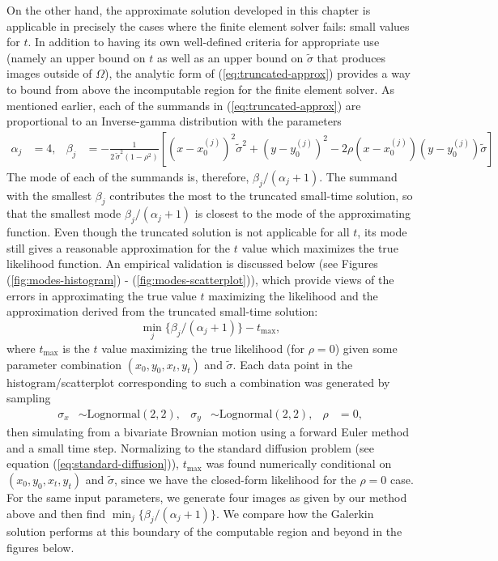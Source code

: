 \documentclass[10pt]{article}
\begin{document}
On the other hand, the approximate solution developed in this chapter
is applicable in precisely the cases where the finite element solver
fails: small values for $t$. In addition to having its own
well-defined criteria for appropriate use (namely an upper bound on
$t$ as well as an upper bound on $\tilde{\sigma}$ that produces images
outside of $\Omega$), the analytic form of (\ref{eq:truncated-approx})
provides a way to bound from above the incomputable region for the
finite element solver. As mentioned earlier, each of the summands in
(\ref{eq:truncated-approx}) are proportional to an Inverse-gamma
distribution with the parameters
\begin{align*}
  \alpha_j &= 4,& \beta_j &= -\frac{1}{2\, \tilde{\sigma}^2 (1-\rho^2)} \left[
                        \left(x-x_0^{(j)}\right)^2 \tilde{\sigma}^2 +
                        \left(y-y_0^{(j)}\right)^2 -
                        2\rho(x-x_0^{(j)})(y-y_0^{(j)})\tilde{\sigma} \right]
\end{align*}
The mode of each of the summands is, therefore,
$\beta_j/(\alpha_j+1)$. The summand with the smallest $\beta_j$
contributes the most to the truncated small-time solution, so that the
smallest mode $\beta_j/(\alpha_j+1)$ is closest to the mode of
the approximating function. Even though the truncated solution is not
applicable for all $t$, its mode still gives a reasonable
approximation for the $t$ value which maximizes the true likelihood
function. An empirical validation is discussed below (see Figures
(\ref{fig:modes-histogram}) - (\ref{fig:modes-scatterplot})), which
provide views of the errors in approximating the true
value $t$ maximizing the likelihood and the approximation derived from
the truncated small-time solution:
\[
  \min_{j} \{ \beta_j/(\alpha_j+1) \} - t_{\max},
\]
where $t_{\max}$ is the $t$ value maximizing the true likelihood (for
$\rho=0$) given some parameter combination $(x_0, y_0, x_t, y_t)$ and
$\tilde{\sigma}$. Each data point in the histogram/scatterplot
corresponding to such a combination was generated by sampling
\begin{align*}
  \sigma_x &\sim \mbox{Lognormal}(2, 2), & \sigma_y &\sim \mbox{Lognormal}(2, 2), & \rho &= 0,
\end{align*}
then simulating from a bivariate Brownian motion using a forward Euler
method and a small time step. Normalizing to the standard diffusion
problem (see equation (\ref{eq:standard-diffusion})), $t_{\max}$ was
found numerically conditional on $(x_0, y_0, x_t, y_t)$ and
$\tilde{\sigma}$, since we have the closed-form likelihood for the
$\rho=0$ case. For the same input parameters, we generate four images
as given by our method above and then find
$\min_{j} \{ \beta_j/(\alpha_j+1) \}$. We compare how the
Galerkin solution performs at this boundary of the computable region
and beyond in the figures below.
\end{document}

